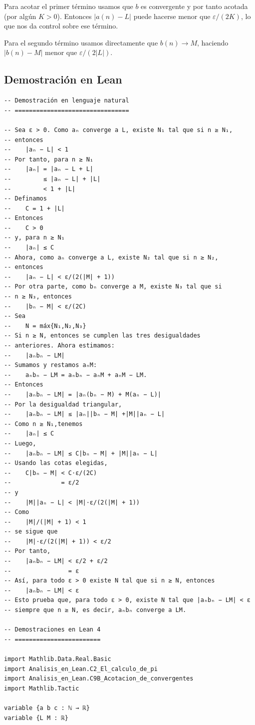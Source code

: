 Para acotar el primer término usamos que $b$ es convergente y por tanto acotada
(por algún $K>0$). Entonces $|a(n)-L|$ puede hacerse menor que $\varepsilon/(2K)$,
lo que nos da control sobre ese término.

Para el segundo término usamos directamente que $b(n)\to M$, haciendo
$|b(n)-M|$ menor que $\varepsilon/(2|L|)$.

\subsection{Demostración en Lean}

\begin{verbatim}
-- Demostración en lenguaje natural
-- ================================

-- Sea ε > 0. Como aₙ converge a L, existe N₁ tal que si n ≥ N₁,
-- entonces
--    |aₙ − L| < 1
-- Por tanto, para n ≥ N₁
--    |aₙ| = |aₙ − L + L|
--         ≤ |aₙ − L| + |L|
--         < 1 + |L|
-- Definamos
--    C = 1 + |L|
-- Entonces
--    C > 0
-- y, para n ≥ N₁
--    |aₙ| ≤ C
-- Ahora, como aₙ converge a L, existe N₂ tal que si n ≥ N₂,
-- entonces
--    |aₙ − L| < ε/(2(|M| + 1))
-- Por otra parte, como bₙ converge a M, existe N₃ tal que si
-- n ≥ N₃, entonces
--    |bₙ − M| < ε/(2C)
-- Sea
--    N = máx⁡{N₁,N₂,N₃}
-- Si n ≥ N, entonces se cumplen las tres desigualdades
-- anteriores. Ahora estimamos:
--    |aₙbₙ − LM|
-- Sumamos y restamos aₙM:
--    aₙbₙ − LM = aₙbₙ − aₙM + aₙM − LM.
-- Entonces
--    |aₙbₙ − LM| = |aₙ(bₙ − M) + M(aₙ − L)|
-- Por la desigualdad triangular,
--    |aₙbₙ − LM| ≤ |aₙ||bₙ − M| +|M||aₙ − L|
-- Como n ≥ N₁,tenemos
--    |aₙ| ≤ C
-- Luego,
--    |aₙbₙ − LM| ≤ C|bₙ − M| + |M||aₙ − L|
-- Usando las cotas elegidas,
--    C|bₙ − M| < C⋅ε/(2C)
--              = ε/2
-- y
--    |M||aₙ − L| < |M|⋅ε/(2(|M| + 1))
-- Como
--    |M|/(|M| + 1) < 1
-- se sigue que
--    |M|⋅ε/(2(|M| + 1)) < ε/2
-- Por tanto,
--    |aₙbₙ − LM| < ε/2 + ε/2
--                = ε
-- Así, para todo ε > 0 existe N tal que si n ≥ N, entonces
--    |aₙbₙ − LM| < ε
-- Esto prueba que, para todo ε > 0, existe N tal que |aₙbₙ − LM| < ε
-- siempre que n ≥ N, es decir, aₙbₙ converge a LM.

-- Demostraciones en Lean 4
-- ========================

import Mathlib.Data.Real.Basic
import Analisis_en_Lean.C2_El_calculo_de_pi
import Analisis_en_Lean.C9B_Acotacion_de_convergentes
import Mathlib.Tactic

variable {a b c : ℕ → ℝ}
variable {L M : ℝ}


\end{verbatim}
